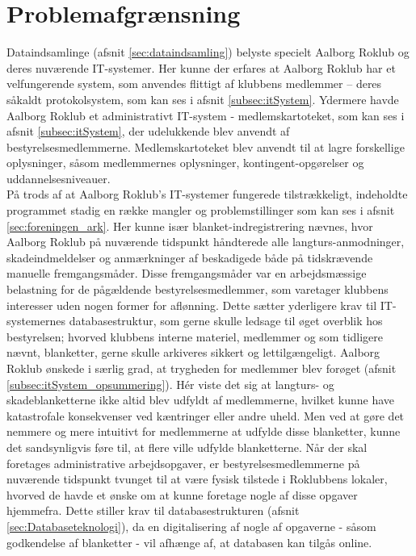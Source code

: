 \section{Problemafgrænsning}
\label{sec:problemafgraensning}

Dataindsamlinge (afsnit \ref{sec:dataindsamling}) belyste specielt Aalborg Roklub og deres nuværende IT-systemer. Her kunne der erfares at Aalborg Roklub har et velfungerende system, som anvendes flittigt af klubbens medlemmer – deres såkaldt protokolsystem, som kan ses i afsnit \ref{subsec:itSystem}. Ydermere havde Aalborg Roklub et administrativt IT-system - medlemskartoteket, som kan ses i afsnit \ref{subsec:itSystem}, der udelukkende blev anvendt af bestyrelsesmedlemmerne. Medlemskartoteket blev anvendt til at lagre forskellige oplysninger, såsom medlemmernes oplysninger, kontingent-opgørelser og uddannelsesniveauer. \\

På trods af at Aalborg Roklub's IT-systemer fungerede tilstrækkeligt, indeholdte programmet stadig en række mangler og problemstillinger som kan ses i afsnit \ref{sec:foreningen_ark}. Her kunne især blanket-indregistrering nævnes, hvor Aalborg Roklub på nuværende tidspunkt håndterede alle langturs-anmodninger, skadeindmeldelser og anmærkninger af beskadigede både på tidskrævende manuelle fremgangsmåder. Disse fremgangsmåder var en arbejdsmæssige belastning for de pågældende bestyrelsesmedlemmer, som varetager klubbens interesser uden nogen former for aflønning. Dette sætter yderligere krav til IT-systemernes databasestruktur, som gerne skulle ledsage til øget overblik hos bestyrelsen; hvorved klubbens interne materiel, medlemmer og som tidligere nævnt, blanketter, gerne skulle arkiveres sikkert og lettilgængeligt. Aalborg Roklub ønskede i særlig grad, at trygheden for medlemmer blev forøget (afsnit \ref{subsec:itSystem_opsummering}). Hér viste det sig at langturs- og skadeblanketterne ikke altid blev udfyldt af medlemmerne, hvilket kunne have katastrofale konsekvenser ved kæntringer eller andre uheld. Men ved at gøre det nemmere og mere intuitivt for medlemmerne at udfylde disse blanketter, kunne det sandsynligvis føre til, at flere ville udfylde blanketterne. Når der skal foretages administrative arbejdsopgaver, er bestyrelsesmedlemmerne på nuværende tidspunkt tvunget til at være fysisk tilstede i Roklubbens lokaler, hvorved de havde et ønske om at kunne foretage nogle af disse opgaver hjemmefra. Dette stiller krav til databasestrukturen (afsnit \ref{sec:Databaseteknologi}), da en digitalisering af nogle af opgaverne - såsom godkendelse af blanketter - vil afhænge af, at databasen kan tilgås online. \\

